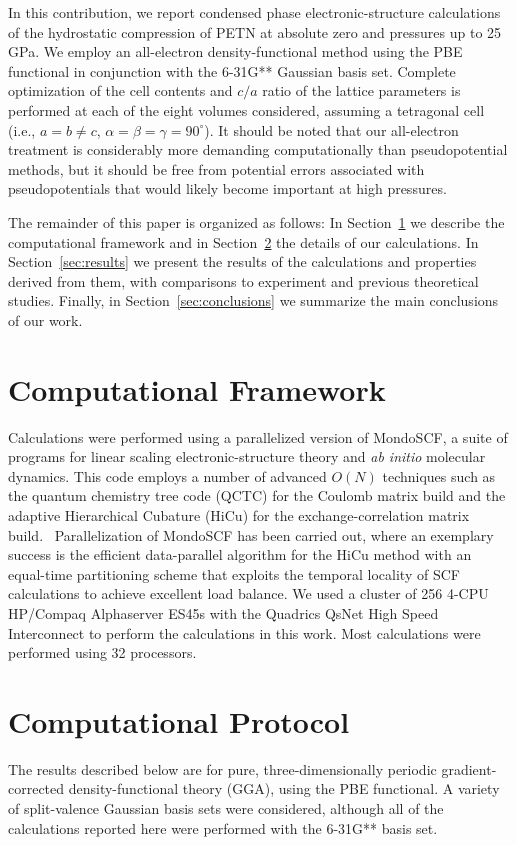 \documentclass[prb,aps,nobibnotes,twocolumn,doublespace,twocolumngrid,superbib]{revtex4}
\begin{document}
In this contribution, we report condensed phase electronic-structure
calculations of the hydrostatic compression of PETN at absolute zero
and pressures up to 25 GPa.  We employ an all-electron
density-functional method using the PBE functional in conjunction with
the 6-31G** Gaussian basis set.  Complete optimization of the cell
contents and $c/a$ ratio of the lattice parameters is performed at
each of the eight volumes considered, assuming a tetragonal cell
(i.e., $a=b \neq c$, $\alpha=\beta=\gamma=90^\circ$).  It should be
noted that our all-electron treatment is considerably more demanding
computationally than pseudopotential methods, but it should be free
from potential errors associated with pseudopotentials that would
likely become important at high pressures.

The remainder of this paper is organized as follows: In
Section~\ref{sec:comput} we describe the computational framework and
in Section~\ref{sec:protocol} the details of our calculations. In
Section~\ref{sec:results} we present the results of the calculations
and properties derived from them, with comparisons to experiment and
previous theoretical studies.  Finally, in
Section~\ref{sec:conclusions} we summarize the main conclusions of our
work.

\section{Computational Framework}
\label{sec:comput}
Calculations were performed using a parallelized version of
MondoSCF,\cite{MondoSCF} a suite of programs for linear scaling
electronic-structure theory and {\it ab initio} molecular dynamics.
This code employs a number of advanced $O(N)$ techniques such as the
quantum chemistry tree code (QCTC) for the Coulomb matrix build
\cite{MChallacombe96,MChallacombe96B,MChallacombe97} and
the adaptive Hierarchical Cubature (HiCu) for the exchange-correlation
matrix build.~\cite{MChallacombe00A} Parallelization of MondoSCF has
been carried out, where an exemplary success is the efficient
data-parallel algorithm for the HiCu method\cite{CGan03} with an
equal-time partitioning scheme that exploits the temporal locality of
SCF calculations to achieve excellent load balance. We used a cluster
of 256 4-CPU HP/Compaq Alphaserver ES45s with the Quadrics QsNet High
Speed Interconnect to perform the calculations in this work.  Most
calculations were performed using 32 processors.

\section{Computational Protocol}
\label{sec:protocol}
The results described below are for pure, three-dimensionally periodic
gradient-corrected density-functional theory (GGA), using the PBE
functional.\cite{Perdew_96v77} A variety of split-valence Gaussian
basis sets were considered, although all of the calculations reported
here were performed with the 6-31G** basis set.
\end{document}
